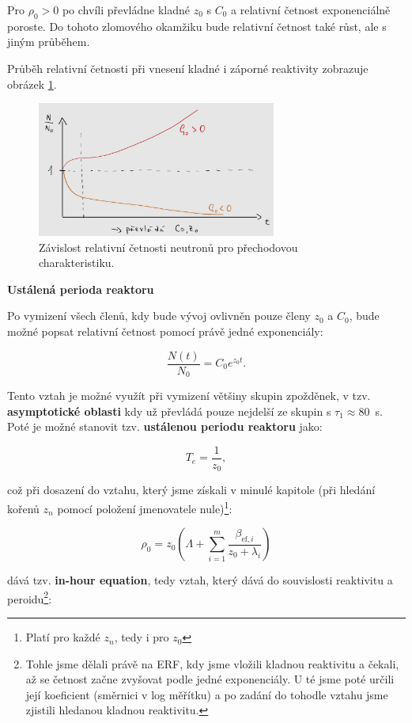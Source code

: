 Pro $\rho_0 > 0$ po chvíli převládne kladné $z_0$ s $C_0$ a relativní četnost exponenciálně poroste. Do tohoto zlomového okamžiku bude relativní četnost také růst, ale s jiným průběhem.

Průběh relativní četnosti při vnesení kladné i záporné reaktivity zobrazuje obrázek \ref{fig_prechodova}.

\begin{figure}[H]
  \centering
  \includegraphics[width=0.7\textwidth]{img/prechodova.jpg}
  \caption{Závislost relativní četnosti neutronů pro přechodovou charakteristiku.}
  \label{fig_prechodova}
\end{figure}

\textbf{Ustálená perioda reaktoru}

Po vymizení všech členů, kdy bude vývoj ovlivněn pouze členy $z_0$ a $C_0$, bude možné popsat relativní četnost pomocí právě jedné exponenciály:

$$ \dfrac{N(t)}{N_0} = C_0 e^{z_0 t}. $$

Tento vztah je možné využít při vymizení většiny skupin zpožděnek, v tzv. \textbf{asymptotické oblasti} kdy už převládá pouze nejdelší ze skupin s $\tau_1 \approx 80$~s. Poté je možné stanovit tzv. \textbf{ustálenou periodu reaktoru} jako:

$$ T_e = \dfrac{1}{z_0}, $$

což při dosazení do vztahu, který jsme získali v minulé kapitole (při hledání kořenů $z_n$ pomocí položení jmenovatele nule)\footnote{Platí pro každé $z_n$, tedy i pro $z_0$}:

\begin{equation}
  \rho_0 = z_0 \left ( \Lambda + \sum_{i = 1}^m \dfrac{\beta_{\text{ef},i}}{z_0 + \lambda_i} \right )
  \label{rho0-z0}
\end{equation}

dává tzv. \textbf{in-hour equation}, tedy vztah, který dává do souvislosti reaktivitu a peroidu\footnote{Tohle jsme dělali právě na ERF, kdy jsme vložili kladnou reaktivitu a čekali, až se četnost začne zvyšovat podle jedné exponenciály. U té jsme poté určili její koeficient (směrnici v log měřítku) a po zadání do tohodle vztahu jsme zjistili hledanou kladnou reaktivitu.}:

